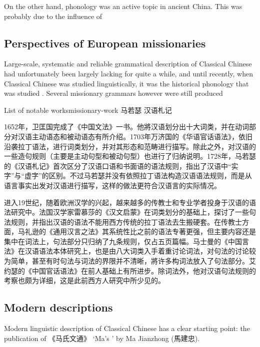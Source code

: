 \documentclass[UTF8, a4paper, oneside, scheme=plain, 12pt]{ctexrep}
\newcommand*{\citepage}[1]{p.~{#1}}
\newcommand{\translate}[1]{`#1'}
\begin{document}
On the other hand, phonology was an active topic in ancient China.
This was probably due to the influence of 

\subsection{Perspectives of European missionaries}

Large-scale, systematic and reliable grammatical description of Classical Chinese had unfortunately been largely lacking for quite a while, and until recently, when Classical Chinese was studied linguistically, it was the historical phonology that was studied \citep[\citepage{xiii}]{pulleyblank1995outline}.
Several missionary grammars however were still produced 

\begin{todobox}{List of notable works}{missionary-work}
    马若瑟 汉语札记

    1652年，卫匡国完成了《中国文法》一书。他將汉语划分出十大词类，并在动词部分对汉语主动语态和被动语态有所介绍。1703年万济国的《华语官话语法》，依旧沿袭拉丁语法，进行词类划分，并对其形态和范畴进行描写。除此之外，对汉语的一些造句规则（主要是主动句型和被动句型）也进行了归纳说明。1728年，马若瑟的《汉语札记》首次区分了汉语口语和书面语的语法规则，指出了汉语中“实字”与“虚字”的区别。不过马若瑟并没有依照拉丁语法构造汉语语法规则，而是从语言事实出发对汉语进行描写，这样的做法更符合汉语言的实际情况。

    进入19世纪，随着欧洲汉学的兴起，越来越多的传教士和专业学者投身于汉语的语法研究中。法国汉学家雷慕莎的《汉文启蒙》在词类划分的基础上，探讨了一些句法规则，并指出汉语的语法不能用西方传统的拉丁语法去生搬硬套。在传教士方面，马礼逊的《通用汉言之法》其系统性比之前的语法专著更强，但主要内容还是集中在词法上，句法部分只归纳了九条规则，仅占五页篇幅。马士曼的《中国言法》在汉语语法本体研究上，也是由八大词类入手着重讨论词法，对句法的讨论较为简单，甚至有时句法与词法的界限并不清晰，將许多构词法放入了句法部分。艾约瑟的《中国官话语法》在前人基础上有所进步。除词法外，他对汉语句法规则的考察也颇为详细，这是此前西方人研究中所少见的。
\end{todobox}

\subsection{Modern descriptions}\label{sec:introduction.previous.modern}

Modern linguistic description of Classical Chinese has a clear starting point:
the publication of 《马氏文通》 \translate{Ma's } by Ma Jianzhong (馬建忠).
\end{document}
